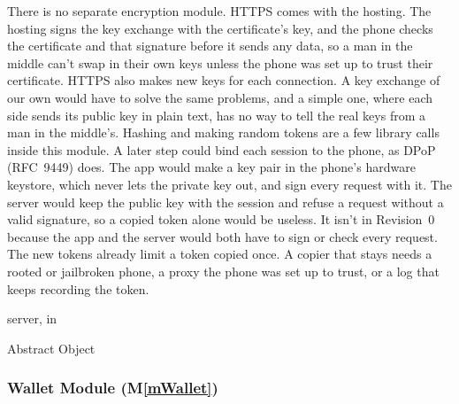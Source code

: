\documentclass[12pt, titlepage]{article}
\newcommand{\mref}[1]{M\ref{#1}}
\begin{document}
\begin{description}
There is no separate encryption module. HTTPS comes with the hosting. The hosting signs the key exchange with the certificate's key, and the phone checks the certificate and that signature before it sends any data, so a man in the middle can't swap in their own keys unless the phone was set up to trust their certificate. HTTPS also makes new keys for each connection. A key exchange of our own would have to solve the same problems, and a simple one, where each side sends its public key in plain text, has no way to tell the real keys from a man in the middle's. Hashing and making random tokens are a few library calls inside this module. A later step could bind each session to the phone, as DPoP (RFC~9449) does. The app would make a key pair in the phone's hardware keystore, which never lets the private key out, and sign every request with it. The server would keep the public key with the session and refuse a request without a valid signature, so a copied token alone would be useless. It isn't in Revision~0 because the app and the server would both have to sign or check every request. The new tokens already limit a token copied once. A copier that stays needs a rooted or jailbroken phone, a proxy the phone was set up to trust, or a log that keeps recording the token.
\item[Implemented By:] \progname{} server, in 
\item[Type of Module:] Abstract Object
\end{description}

\subsubsection{Wallet Module (\mref{mWallet})}
\end{document}
